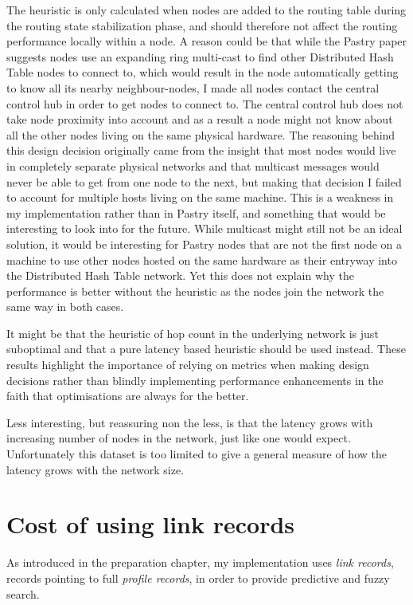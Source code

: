 The heuristic is only calculated when nodes are added to the routing table during the routing state stabilization phase, and should therefore not affect the routing performance locally within a node.
A reason could be that while the Pastry paper \cite{pastry} suggests nodes use an expanding ring multi-cast to find other Distributed Hash Table nodes to connect to, which would result in the node automatically getting to know all its nearby neighbour-nodes, I made all nodes contact the central control hub in order to get nodes to connect to. The central control hub does not take node proximity into account and as a result a node might not know about all the other nodes living on the same physical hardware. The reasoning behind this design decision originally came from the insight that most nodes would live in completely separate physical networks and that multicast messages would never be able to get from one node to the next, but making that decision I failed to account for multiple hosts living on the same machine.
This is a weakness in my implementation rather than in Pastry itself, and something that would be interesting to look into for the future. While multicast might still not be an ideal solution, it would be interesting for Pastry nodes that are not the first node on a machine to use other nodes hosted on the same hardware as their entryway into the Distributed Hash Table network.
Yet this does not explain why the performance is better without the heuristic as the nodes join the network the same way in both cases.

It might be that the heuristic of hop count in the underlying network is just suboptimal and that a pure latency based heuristic should be used instead.
These results highlight the importance of relying on metrics when making design decisions rather than blindly implementing performance enhancements in the faith that optimisations are always for the better.

Less interesting, but reassuring non the less, is that the latency grows with increasing number of nodes in the network, just like one would expect. Unfortunately this dataset is too limited to give a general measure of how the latency grows with the network size.

\section{Cost of using link records}
\label{sec:costOfLinkRecords}
As introduced in the preparation chapter, my implementation uses \emph{link records}, records pointing to full \emph{profile records}, in order to provide predictive and fuzzy search.

